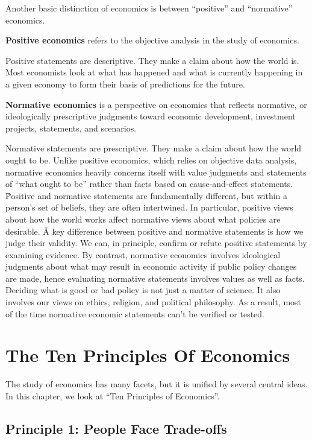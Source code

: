 Another basic distinction of economics is between ``positive'' and ``normative'' economics.

\textbf{Positive economics} refers to the objective analysis in the study of economics.
\ed

Positive statements are descriptive. They make a claim about how the world is. Most economists look at what has happened
and what is currently happening in a given economy to form their basis of predictions for the future.

\textbf{Normative economics} is a perspective on economics that reflects normative, or ideologically prescriptive
judgments toward economic development, investment projects, statements, and scenarios.
\ed

Normative statements are prescriptive. They make a claim about how the world ought to be. Unlike positive economics,
which relies on objective data analysis, normative economics heavily concerns itself with value judgments and statements
of ``what ought to be'' rather than facts based on cause-and-effect statements. \v

Positive and normative statements are fundamentally different, but within a person's set of beliefs, they are often
intertwined. In particular, positive views about how the world works affect normative views about what policies are
desirable. \v

A key difference between positive and normative statements is how we judge their validity. We can, in principle,
confirm or refute positive statements by examining evidence. By contrast, normative economics involves ideological
judgments about what may result in economic activity if public policy changes are made, hence evaluating normative
statements involves values as well as facts. Deciding what is good or bad policy is not just a matter of science. It
also involves our views on ethics, religion, and political philosophy. As a result, most of the time normative
economic statements can't be verified or tested.

\section{The Ten Principles Of Economics}

The study of economics has many facets, but it is unified by several central ideas. In this chapter, we look at ``Ten
Principles of Economics''.

\subsection*{Principle 1: People Face Trade-offs}

